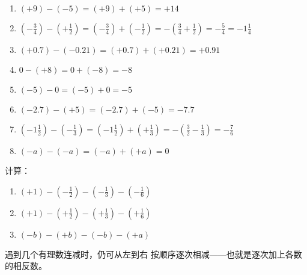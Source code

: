 \begin{solution}
\begin{enumerate}
        \item $(+9)-(-5)=(+9)+(+5)=+14$
        \item $\left(-\frac{3}{4}\right)-\left(+\frac{1}{2}\right)=\left(-\frac{3}{4}\right)+\left(-\frac{1}{2}\right)=-\left(\frac{3}{4}+\frac{1}{2}\right)=-\frac{5}{4}=-1\frac{1}{4}$
        \item $(+0.7)-(-0.21)=(+0.7)+(+0.21)=+0.91$
        \item $0-(+8)=0+(-8)=-8$
        \item $(-5)-0=(-5)+0=-5$
        \item $(-2.7)-(+5)=(-2.7)+(-5)=-7.7$
        \item $\left(-1\frac{1}{2}\right)-\left(-\frac{1}{3}\right)=\left(-1\frac{1}{2}\right)+\left(+\frac{1}{3}\right)=-\left(\frac{3}{2}-\frac{1}{3}\right)=-\frac{7}{6}$
        \item $(-a)-(-a)=(-a)+(+a)=0$
    \end{enumerate}    
\end{solution}

\begin{example}
    计算：
\begin{enumerate}
    \item $(+1)-\left(-\frac{1}{2}\right)-\left(-\frac{1}{3}\right)-\left(-\frac{1}{6}\right)$
    \item $(+1)-\left(+\frac{1}{2}\right)-\left(+\frac{1}{3}\right)-\left(+\frac{1}{6}\right)$
    \item $(-b)-(+b)-(-b)-(+a)$
\end{enumerate}
\end{example}

\begin{analyze}
遇到几个有理数连减时，仍可从左到右
按顺序逐次相减——也就是逐次加上各数的相反数。
\end{analyze}

